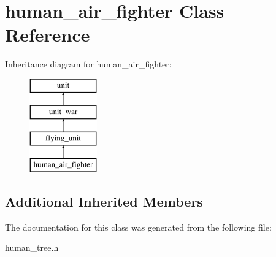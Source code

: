 \hypertarget{classhuman__air__fighter}{}\section{human\+\_\+air\+\_\+fighter Class Reference}
\label{classhuman__air__fighter}
Inheritance diagram for human\+\_\+air\+\_\+fighter\+:\begin{figure}[H]
\begin{center}
\leavevmode
\includegraphics[height=4.000000cm]{classhuman__air__fighter}
\end{center}
\end{figure}
\subsection*{Additional Inherited Members}


The documentation for this class was generated from the following file\+:\begin{DoxyCompactItemize}
\item 
human\+\_\+tree.\+h\end{DoxyCompactItemize}
